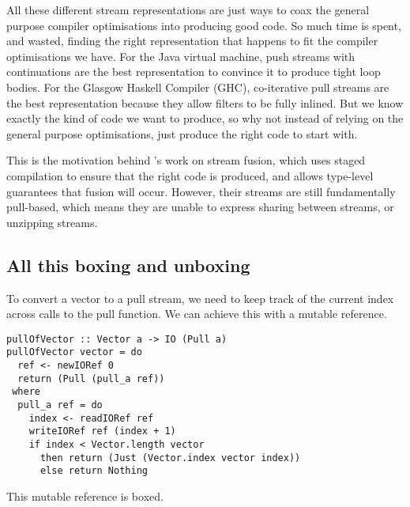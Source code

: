 All these different stream representations are just ways to coax the general purpose compiler optimisations into producing good code.
So much time is spent, and wasted, finding the right representation that happens to fit the compiler optimisations we have.
For the Java virtual machine, push streams with continuations are the best representation to convince it to produce tight loop bodies.
For the Glasgow Haskell Compiler (GHC), co-iterative pull streams are the best representation because they allow filters to be fully inlined.
But we know exactly the kind of code we want to produce, so why not instead of relying on the general purpose optimisations, just produce the right code to start with.

This is the motivation behind \citet{kiselyov2016stream}'s work on stream fusion, which uses staged compilation to ensure that the right code is produced, and allows type-level guarantees that fusion will occur.
However, their streams are still fundamentally pull-based, which means they are unable to express sharing between streams, or unzipping streams.

\subsection{All this boxing and unboxing}

To convert a vector to a pull stream, we need to keep track of the current index across calls to the pull function.
We can achieve this with a mutable reference.

\begin{lstlisting}
pullOfVector :: Vector a -> IO (Pull a)
pullOfVector vector = do
  ref <- newIORef 0
  return (Pull (pull_a ref))
 where
  pull_a ref = do
    index <- readIORef ref
    writeIORef ref (index + 1)
    if index < Vector.length vector
      then return (Just (Vector.index vector index))
      else return Nothing
\end{lstlisting}

This mutable reference is boxed. 



